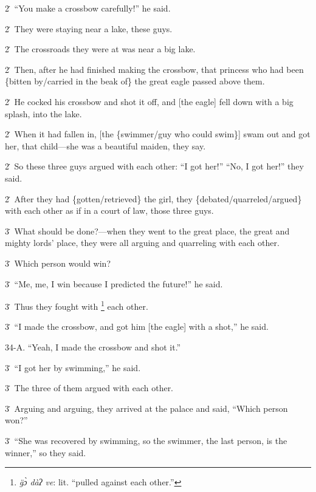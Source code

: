 2\. ``You make a crossbow carefully!'' he said.

2\. They were staying near a lake, these guys.

2\. The crossroads they were at was near a big lake.

2\. Then, after he had finished making the crossbow, that princess who had been
\{bitten by/carried in the beak of\} the great eagle passed above them.

2\. He cocked his crossbow and shot it off, and [the eagle] fell down with a big
splash, into the lake.

2\. When it had fallen in, [the \{swimmer/guy who could swim\}] swam out and got
her, that child---she was a beautiful maiden, they say.

2\. So these three guys argued with each other: ``I got her!'' ``No, I got her!''
they said.

2\. After they had \{gotten/retrieved\} the girl, they \{debated/quarreled/argued\}
with each other as if in a court of law, those three guys.

3\. What should be done?---when they went to the great place, the great and mighty
lords' place, they were all arguing and quarreling with each other.

3\. Which person would win?

3\. ``Me, me, I win because I predicted the future!'' he said.

3\. Thus they fought with \footnote{\textit{g̈ɔ̀ dàʔ ve}: lit. ``pulled against each other.''} each other.

3\. ``I made the crossbow, and got him [the eagle] with a shot,'' he said.

34-A. ``Yeah, I made the crossbow and shot it.''

3\. ``I got her by swimming,'' he said.

3\. The three of them argued with each other.

3\. Arguing and arguing, they arrived at the palace and said, ``Which person won?''

3\. ``She was recovered by swimming, so the swimmer, the last person, is the winner,''
so they said.


